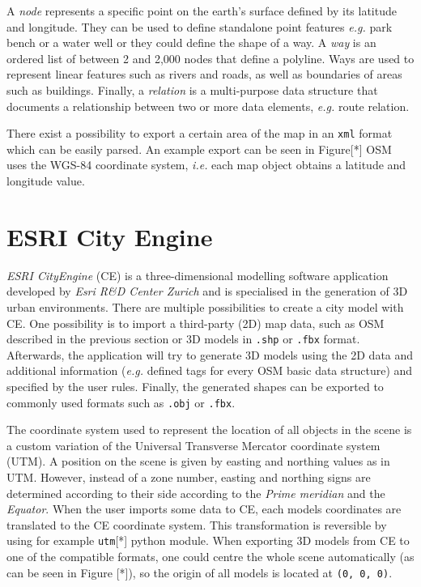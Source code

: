 A \emph{node} represents a specific point on the earth's surface defined by its latitude and longitude. They can be used to define standalone point features \emph{e.g.} park bench or a water well or they could define the shape of a way. A \emph{way} is an ordered list of between 2 and 2,000 nodes that define a polyline. Ways are used to represent linear features such as rivers and roads, as well as boundaries of areas such as buildings. Finally, a \emph{relation} is a multi-purpose data structure that documents a relationship between two or more data elements, \emph{e.g.} route relation.

There exist a possibility to export a certain area of the map in an \texttt{xml} format which can be easily parsed. An example export can be seen in Figure[*] OSM uses the WGS-84 coordinate system, \emph{i.e.} each map object obtains a latitude and longitude value. 

\section{ESRI City Engine}
\label{ch:ce}
\emph{ESRI CityEngine} (CE) is a three-dimensional modelling software application developed by \emph{Esri R\&D Center Zurich} and is specialised in the generation of 3D urban environments. There are multiple possibilities to create a city model with CE. One possibility is to import a third-party (2D) map data, such as OSM described in the previous section or 3D models in \texttt{.shp} or \texttt{.fbx} format. Afterwards, the application will try to generate 3D models using the 2D data and additional information (\emph{e.g.} defined tags for every OSM basic data structure) and specified by the user rules. Finally, the generated shapes can be exported to commonly used formats such as \texttt{.obj} or \texttt{.fbx}. 

The coordinate system used to represent the location of all objects in the scene is a custom variation of the Universal Transverse Mercator coordinate system (UTM). A position on the scene is given by easting and northing values as in UTM. However, instead of a zone number, easting and northing signs are determined according to their side according to the \emph{Prime meridian} and the \emph{Equator}. When the user imports some data to CE, each models coordinates are translated to the CE coordinate system. This transformation is reversible by using for example \texttt{utm}[*] python module. When exporting 3D models from CE to one of the compatible formats, one could centre the whole scene automatically (as can be seen in Figure [*]), so the origin of all models is located at \texttt{(0, 0, 0)}.

